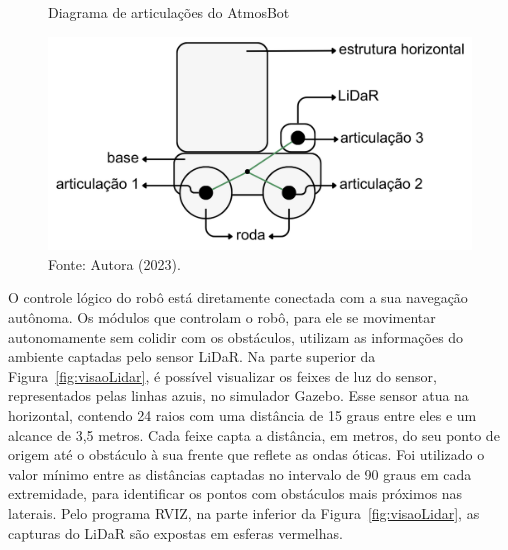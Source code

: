 \begin{figure}[H]
    \centering
    \caption{Diagrama de articulações do AtmosBot}
    \includegraphics[scale=0.4]{articulacoes.png}
    \caption*{Fonte: Autora (2023).}
    \label{fig:roboArticulacoes}
\end{figure}

O controle lógico do robô está diretamente conectada com a sua navegação autônoma. Os módulos que controlam o robô, para ele se movimentar autonomamente sem colidir com os obstáculos, utilizam as informações do ambiente captadas pelo sensor LiDaR. Na parte superior da Figura~\ref{fig:visaoLidar}, é possível visualizar os feixes de luz do sensor, representados pelas linhas azuis, no simulador Gazebo. Esse sensor atua na horizontal, contendo 24 raios com uma distância de 15 graus entre eles e um alcance de 3,5 metros. Cada feixe capta a distância, em metros, do seu ponto de origem até o obstáculo à sua frente que reflete as ondas óticas. Foi utilizado o valor mínimo entre as distâncias captadas no intervalo de 90 graus em cada extremidade, para identificar os pontos com obstáculos mais próximos nas laterais. Pelo programa RVIZ, na parte inferior da Figura~\ref{fig:visaoLidar}, as capturas do LiDaR são expostas em esferas vermelhas.


